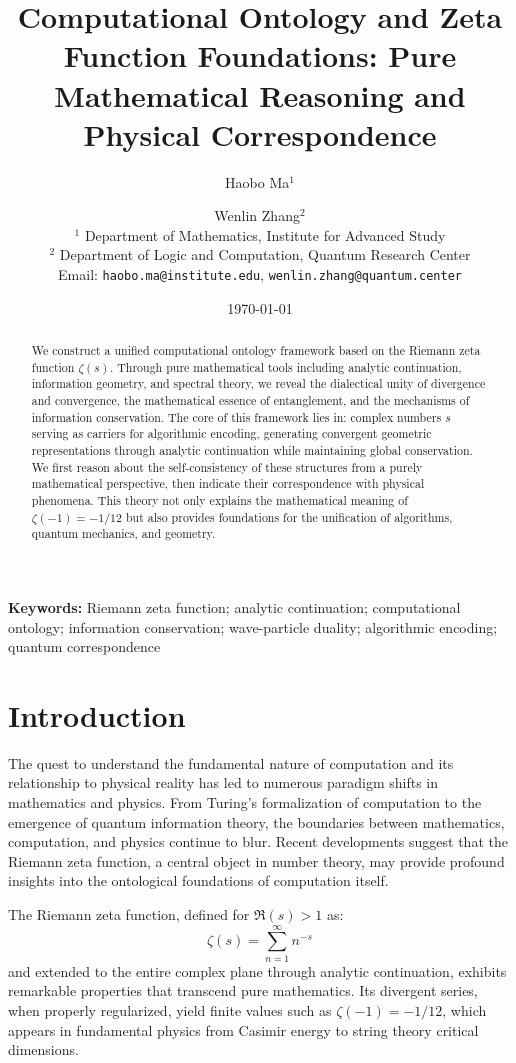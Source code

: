 \documentclass[11pt]{article}
\title{\textbf{Computational Ontology and Zeta Function Foundations: Pure Mathematical Reasoning and Physical Correspondence}}
\author{
Haobo Ma$^1$ \and Wenlin Zhang$^2$ \\
$^1$ Department of Mathematics, Institute for Advanced Study \\
$^2$ Department of Logic and Computation, Quantum Research Center \\
Email: \texttt{haobo.ma@institute.edu}, \texttt{wenlin.zhang@quantum.center}
}
\date{\today}
\begin{document}
\maketitle

\begin{abstract}
We construct a unified computational ontology framework based on the Riemann zeta function $\zeta(s)$. Through pure mathematical tools including analytic continuation, information geometry, and spectral theory, we reveal the dialectical unity of divergence and convergence, the mathematical essence of entanglement, and the mechanisms of information conservation. The core of this framework lies in: complex numbers $s$ serving as carriers for algorithmic encoding, generating convergent geometric representations through analytic continuation while maintaining global conservation. We first reason about the self-consistency of these structures from a purely mathematical perspective, then indicate their correspondence with physical phenomena. This theory not only explains the mathematical meaning of $\zeta(-1) = -1/12$ but also provides foundations for the unification of algorithms, quantum mechanics, and geometry.
\end{abstract}

\textbf{Keywords:} Riemann zeta function; analytic continuation; computational ontology; information conservation; wave-particle duality; algorithmic encoding; quantum correspondence

\section{Introduction}

The quest to understand the fundamental nature of computation and its relationship to physical reality has led to numerous paradigm shifts in mathematics and physics. From Turing's formalization of computation to the emergence of quantum information theory, the boundaries between mathematics, computation, and physics continue to blur. Recent developments suggest that the Riemann zeta function, a central object in number theory, may provide profound insights into the ontological foundations of computation itself.

The Riemann zeta function, defined for $\Re(s) > 1$ as:
$$\zeta(s) = \sum_{n=1}^{\infty} n^{-s}$$
and extended to the entire complex plane through analytic continuation, exhibits remarkable properties that transcend pure mathematics. Its divergent series, when properly regularized, yield finite values such as $\zeta(-1) = -1/12$, which appears in fundamental physics from Casimir energy to string theory critical dimensions.
\end{document}

